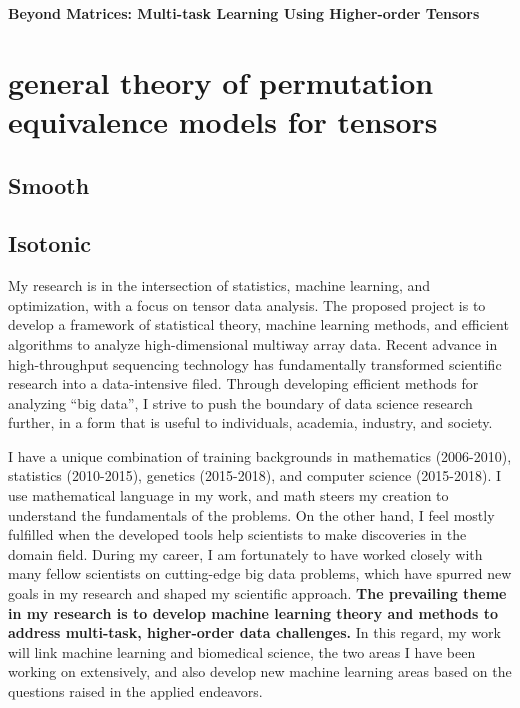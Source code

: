\documentclass[10pt]{article}
\theoremstyle{definition}
\theoremstyle{definition}
\theoremstyle{definition}
\begin{document}
\begin{center}
{\bf \large Beyond Matrices: Multi-task Learning Using Higher-order Tensors}\\
\vspace{.3cm}
\end{center}

\section{general theory of permutation equivalence models for tensors}

\subsection{Smooth}


\subsection{Isotonic}



My research is in the intersection of statistics, machine learning, and optimization, with a focus on tensor data analysis.
The proposed project is to develop a framework of statistical theory, machine learning methods, and efficient algorithms to analyze high-dimensional multiway array data. Recent advance in high-throughput sequencing technology has fundamentally transformed scientific research into a data-intensive filed. Through developing efficient methods for analyzing ``big data'', I strive to push the boundary of data science research further, in a form that is useful to individuals, academia, industry, and society. 

I have a unique combination of training backgrounds in mathematics (2006-2010), statistics (2010-2015), genetics (2015-2018), and computer science (2015-2018). I use mathematical language in my work, and math steers my creation to understand the fundamentals of the problems. On the other hand, I feel mostly fulfilled when the developed tools help scientists to make discoveries in the domain field. During my career, I am fortunately to have worked closely with many fellow scientists on cutting-edge big data problems, which have spurred new goals in my research and shaped my scientific approach. {\bf The prevailing theme in my research is to develop machine learning theory and methods to address multi-task, higher-order data challenges.} In this regard, my work will link machine learning and biomedical science, the two areas I have been working on extensively, and also develop new machine learning areas based on the questions raised in the applied endeavors.
\end{document}
